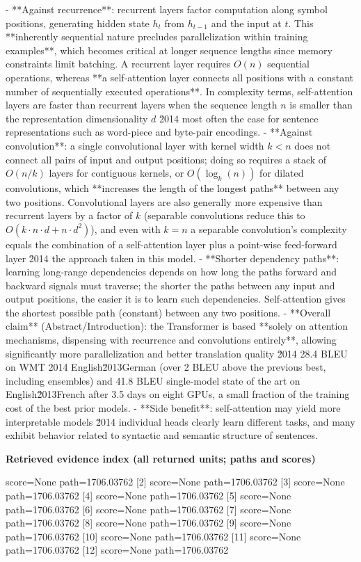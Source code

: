 \documentclass[10pt]{article}
\begin{document}
\begin{AnswerText}
- **Against recurrence**: recurrent layers factor computation along symbol positions, generating hidden state $h_t$ from $h_{t-1}$ and the input at $t$. This **inherently sequential nature precludes parallelization within training examples**, which becomes critical at longer sequence lengths since memory constraints limit batching. A recurrent layer requires $O(n)$ sequential operations, whereas **a self-attention layer connects all positions with a constant number of sequentially executed operations**. In complexity terms, self-attention layers are faster than recurrent layers when the sequence length $n$ is smaller than the representation dimensionality $d$ \u2014 most often the case for sentence representations such as word-piece and byte-pair encodings.
- **Against convolution**: a single convolutional layer with kernel width $k<n$ does not connect all pairs of input and output positions; doing so requires a stack of $O(n/k)$ layers for contiguous kernels, or $O(\log_k(n))$ for dilated convolutions, which **increases the length of the longest paths** between any two positions. Convolutional layers are also generally more expensive than recurrent layers by a factor of $k$ (separable convolutions reduce this to $O(k\cdot n\cdot d + n\cdot d^2)$), and even with $k=n$ a separable convolution's complexity equals the combination of a self-attention layer plus a point-wise feed-forward layer \u2014 the approach taken in this model.
- **Shorter dependency paths**: learning long-range dependencies depends on how long the paths forward and backward signals must traverse; the shorter the paths between any input and output positions, the easier it is to learn such dependencies. Self-attention gives the shortest possible path (constant) between any two positions.
- **Overall claim** (Abstract/Introduction): the Transformer is based **solely on attention mechanisms, dispensing with recurrence and convolutions entirely**, allowing significantly more parallelization and better translation quality \u2014 28.4 BLEU on WMT 2014 English\u2013German (over 2 BLEU above the previous best, including ensembles) and 41.8 BLEU single-model state of the art on English\u2013French after 3.5 days on eight GPUs, a small fraction of the training cost of the best prior models.
- **Side benefit**: self-attention may yield more interpretable models \u2014 individual heads clearly learn different tasks, and many exhibit behavior related to syntactic and semantic structure of sentences.
\end{AnswerText}

\textbf{Retrieved evidence index (all returned units; paths and scores) }
\begin{EvidenceText}
[1] score=None path=1706.03762
[2] score=None path=1706.03762
[3] score=None path=1706.03762
[4] score=None path=1706.03762
[5] score=None path=1706.03762
[6] score=None path=1706.03762
[7] score=None path=1706.03762
[8] score=None path=1706.03762
[9] score=None path=1706.03762
[10] score=None path=1706.03762
[11] score=None path=1706.03762
[12] score=None path=1706.03762
\end{EvidenceText}
\end{document}
